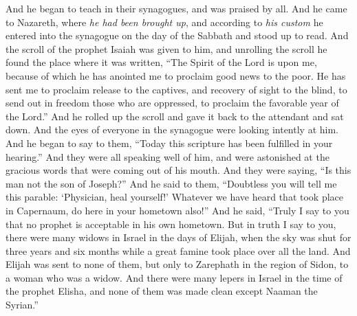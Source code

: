 \begin{biblechapter}
\verse And he began to teach in their synagogues, and was praised by all.
 And he came to Nazareth, where \textit{he had been brought up}, and according to \textit{his custom} he entered into the synagogue on the day of the Sabbath and stood up to read.
\verse And the scroll of the prophet Isaiah was given to him, and unrolling the scroll he found the place where it was written,
\verse “The Spirit of the Lord is upon me, 
because of which he has anointed me 
to proclaim good news to the poor. 
He has sent me 
to proclaim release to the captives, 
and recovery of sight to the blind, 
to send out in freedom those who are oppressed,
\verse to proclaim the favorable year of the Lord.”
\verse And he rolled up the scroll and gave it back to the attendant and sat down. And the eyes of everyone in the synagogue were looking intently at him.
\verse And he began to say to them, “Today this scripture has been fulfilled in your hearing.”
\verse And they were all speaking well of him, and were astonished at the gracious words that were coming out of his mouth. And they were saying, “Is this man not the son of Joseph?”
\verse And he said to them, “Doubtless you will tell me this parable: ‘Physician, heal yourself!’ Whatever we have heard that took place in Capernaum, do here in your hometown also!”
\verse And he said, “Truly I say to you that no prophet is acceptable in his own hometown.
\verse But in truth I say to you, there were many widows in Israel in the days of Elijah, when the sky was shut for three years and six months while a great famine took place over all the land.
\verse And Elijah was sent to none of them, but only to Zarephath in the region of Sidon, to a woman who was a widow.
\verse And there were many lepers in Israel in the time of the prophet Elisha, and none of them was made clean except Naaman the Syrian.”

\end{biblechapter}
